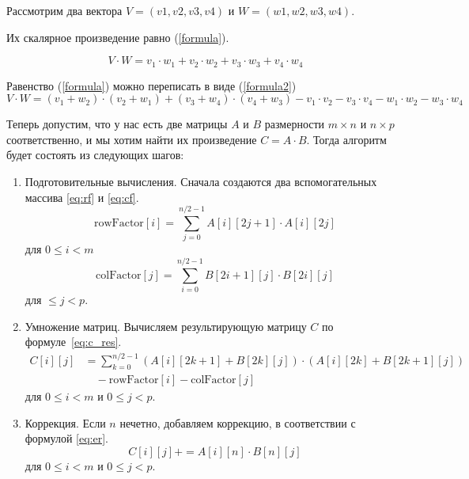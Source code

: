 Рассмотрим два вектора $V = (v1, v2, v3, v4)$ и $W = (w1, w2, w3, w4)$.  

Их скалярное произведение равно (\ref{formula}).

\begin{equation} \label{formula}
	V \cdot W=v_1 \cdot w_1 + v_2 \cdot w_2 + v_3 \cdot w_3 + v_4 \cdot w_4
\end{equation}

Равенство (\ref{formula}) можно переписать в виде (\ref{formula2}) 
\begin{equation} \label{formula2}
	V \cdot W=(v_1 + w_2) \cdot (v_2 + w_1) + (v_3 + w_4) \cdot (v_4 + w_3) - v_1 \cdot v_2 - v_3 \cdot v_4 - w_1 \cdot w_2 - w_3 \cdot w_4
\end{equation}

Теперь допустим, что у нас есть две матрицы $A$ и $B$ размерности $m \times n$ и $n \times p$ соответственно, и мы хотим найти их произведение $C = A \cdot B$.
Тогда алгоритм будет состоять из следующих шагов:

\begin{enumerate}
	\item Подготовительные вычисления. Сначала создаются два вспомогательных массива \eqref{eq:rf} и \eqref{eq:cf}.
	\begin{equation}
	\label{eq:rf}
	\text{{rowFactor}}[i] = \sum_{j=0}^{n/2 - 1} A[i][2j+1] \cdot A[i][2j]
	\end{equation}
	для \(0 \leq i < m\)
	\begin{equation}
	\label{eq:cf}
	\text{{colFactor}}[j] = \sum_{i=0}^{n/2 - 1} B[2i+1][j] \cdot B[2i][j]
	\end{equation}
	для \( \leq j < p\).
	
	\item Умножение матриц. Вычисляем результирующую матрицу $C$ по формуле~\eqref{eq:c_res}.
	\begin{equation}
		\label{eq:c_res}
		\begin{aligned}
			C[i][j] &= \sum_{k=0}^{n/2 - 1} (A[i][2k+1] + B[2k][j]) \cdot (A[i][2k] + B[2k+1][j]) \\
			&\quad - \text{{rowFactor}}[i] - \text{{colFactor}}[j]
		\end{aligned}
	\end{equation}
	для \(0 \leq i < m\) и \(0 \leq j < p\).
	
	\item Коррекция. Если \(n\) нечетно, добавляем коррекцию, в соответствии с формулой \eqref{eq:er}.
	\begin{equation}
		\label{eq:er}
	C[i][j] += A[i][n] \cdot B[n][j]
	\end{equation}
	для \(0 \leq i < m\) и \(0 \leq j < p\). 
\end{enumerate}

